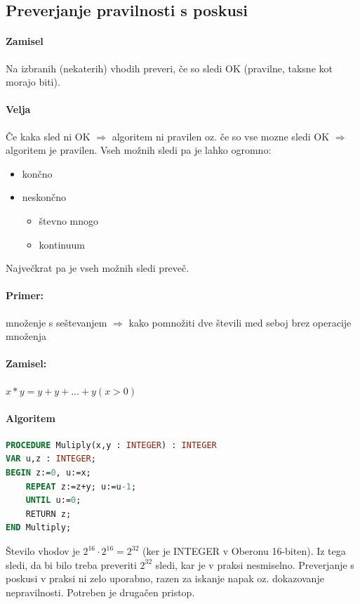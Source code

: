 \documentclass[a4paper,10pt]{article}
\begin{document}
\subsection{Preverjanje pravilnosti s poskusi}
\paragraph{Zamisel}
Na izbranih (nekaterih) vhodih preveri, \v ce so sledi OK (pravilne, taksne kot morajo biti).

\paragraph{Velja}
\v Ce kaka sled ni OK $\Rightarrow$ algoritem ni pravilen oz. \v ce so vse mozne sledi OK $\Rightarrow$ algoritem je pravilen. Vseh mo\v znih sledi pa je lahko ogromno:
\begin{itemize}
\item kon\v cno
\item neskon\v cno
\begin{itemize}
\item \v stevno mnogo
\item kontinuum
\end{itemize}
\end{itemize}

Najve\v ckrat pa je vseh mo\v znih sledi preve\v c.\\

\paragraph{Primer:} mno\v zenje s se\v stevanjem $\Rightarrow$ kako pomno\v ziti dve \v stevili med seboj brez operacije mno\v zenja

\paragraph{Zamisel:} $x \ast y = y + y + ... + y (x>0)$

\paragraph{Algoritem}
\begin{flushleft}
\begin{lstlisting}[language=Pascal,caption={Koda za metodo mno\v zenja s se\v stevanjem}]
PROCEDURE Muliply(x,y : INTEGER) : INTEGER
VAR u,z : INTEGER;
BEGIN z:=0, u:=x;
	REPEAT z:=z+y; u:=u-1;
	UNTIL u:=0;
	RETURN z;
END Multiply;
\end{lstlisting}
\end{flushleft}
\v Stevilo vhodov je $2^{16} \cdot 2^{16} = 2^{32}$ (ker je INTEGER v Oberonu 16-biten). Iz tega sledi, da bi bilo treba preveriti $2^{32}$ sledi, kar je v praksi nesmiselno. Preverjanje s poskusi v praksi ni zelo uporabno, razen za iskanje napak oz. dokazovanje nepravilnosti. Potreben je druga\v cen pristop.
\end{document}
